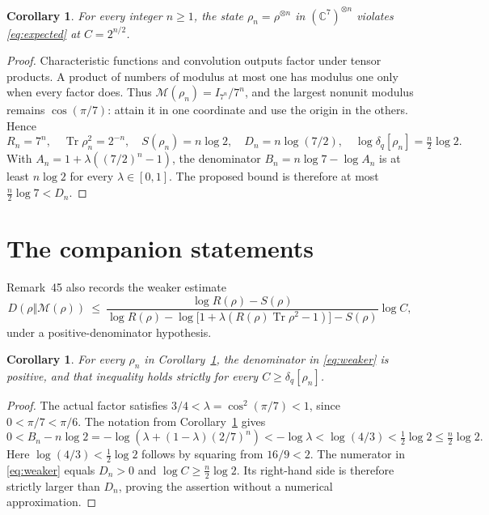 \documentclass[10pt]{article}
\newtheorem{corollary}[theorem]{Corollary}
\newcommand{\Tr}{\operatorname{Tr}}
\newcommand{\MS}{\mathcal M}
\begin{document}
\begin{corollary}\label{cor:tensor}
For every integer $n\ge1$, the state $\rho_n=\rho^{\otimes n}$ in
$(\mathbb C^7)^{\otimes n}$ violates \eqref{eq:expected} at $C=2^{n/2}$.
\end{corollary}
\begin{proof}
Characteristic functions and convolution outputs factor under tensor products.
A product of numbers of modulus at most one has modulus one only when every
factor does. Thus $\MS(\rho_n)=I_{7^n}/7^n$, and the largest nonunit modulus
remains $\cos(\pi/7)$: attain it in one coordinate and use the origin in the
others. Hence
\[
 R_n=7^n,\quad \Tr\rho_n^2=2^{-n},\quad S(\rho_n)=n\log2,
 \quad D_n=n\log(7/2),\quad \log\delta_q[\rho_n]=\tfrac n2\log2.
\]
With $A_n=1+\lambda((7/2)^n-1)$, the denominator
$B_n=n\log7-\log A_n$ is at least $n\log2$ for every $\lambda\in[0,1]$.
The proposed bound is therefore at most $\tfrac n2\log7<D_n$.
\end{proof}

\section{The companion statements}

Remark~45 also records the weaker estimate
\begin{equation}\label{eq:weaker}
 D(\rho\Vert\MS(\rho))\ \le\
 \frac{\log R(\rho)-S(\rho)}{\log R(\rho)-\log\bigl[1+\lambda
 (R(\rho)\Tr\rho^2-1)\bigr]-S(\rho)}\log C,
 \tag{BGJ 59}
\end{equation}
under a positive-denominator hypothesis.

\begin{corollary}\label{cor:weaker}
For every $\rho_n$ in Corollary~\ref{cor:tensor}, the denominator in
\eqref{eq:weaker} is positive, and that inequality holds strictly for
every $C\ge\delta_q[\rho_n]$.
\end{corollary}
\begin{proof}
The actual factor satisfies $3/4<\lambda=\cos^2(\pi/7)<1$, since
$0<\pi/7<\pi/6$. The notation from Corollary~\ref{cor:tensor} gives
\[
 0<B_n-n\log2
 =-\log\!\left(\lambda+(1-\lambda)(2/7)^n\right)
 <-\log\lambda<\log(4/3)<\tfrac12\log2
 \le\tfrac n2\log2.
\]
Here $\log(4/3)<\tfrac12\log2$ follows by squaring from $16/9<2$.
The numerator in \eqref{eq:weaker} equals $D_n>0$ and
$\log C\ge\tfrac n2\log2$. Its right-hand side is therefore strictly
larger than $D_n$, proving the assertion without a numerical approximation.
\end{proof}
\end{document}
